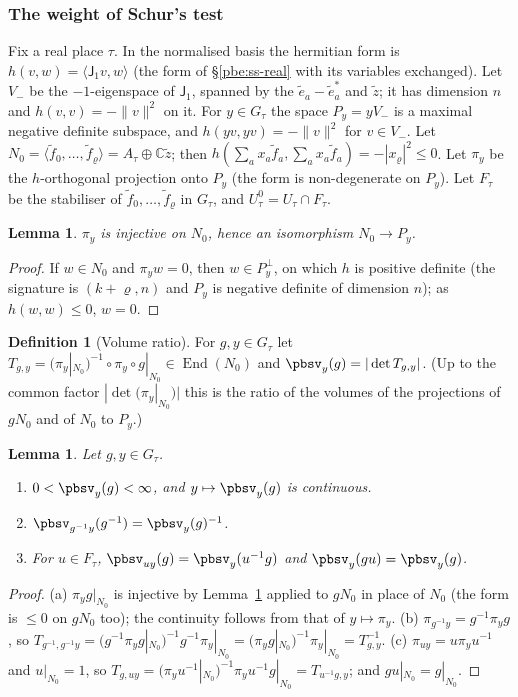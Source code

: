 \documentclass[10pt]{amsart}
\newtheorem{lemma}[theorem]{Lemma}
\theoremstyle{definition}
\newtheorem{definition}[theorem]{Definition}
\theoremstyle{remark}
\newcommand{\C}{\mathbb C}
\begin{document}
\subsubsection{The weight of Schur's test}\label{pbs:ss-schur}

Fix a real place $\tau$. In the normalised basis the hermitian form is $h(v,w)=\langle\mathsf J_1v,
w\rangle$ (the form of \S\ref{pbe:ss-real} with its variables exchanged). Let $V_-$ be the $-1$-eigenspace of $\mathsf J_1$, spanned by the
$\tilde e_a-\tilde e_a^*$ and $\tilde z$; it has dimension $n$ and $h(v,v)=-\|v\|^2$ on it. For $y\in
G_\tau$ the space $P_y=yV_-$ is a maximal negative definite subspace, and $h(yv,yv)=-\|v\|^2$ for
$v\in V_-$. Let $N_0=\langle\tilde f_0,\dots,\tilde f_\varrho\rangle=A_\tau\oplus\C\tilde z$; then
$h(\sum_ax_a\tilde f_a,\sum_ax_a\tilde f_a)=-|x_\varrho|^2\le0$. Let $\pi_y$ be the $h$-orthogonal
projection onto $P_y$ (the form is non-degenerate on $P_y$). Let $F_\tau$ be the stabiliser of
$\tilde f_0,\dots,\tilde f_\varrho$ in $G_\tau$, and $U^0_\tau=U_\tau\cap F_\tau$.

\begin{lemma}\label{pbs:proj}
$\pi_y$ is injective on $N_0$, hence an isomorphism $N_0\to P_y$.
\end{lemma}
\begin{proof}
If $w\in N_0$ and $\pi_yw=0$, then $w\in P_y^\perp$, on which $h$ is positive definite (the signature
is $(k+\varrho,n)$ and $P_y$ is negative definite of dimension $n$); as $h(w,w)\le0$, $w=0$.
\end{proof}

\begin{definition}[Volume ratio]\label{pbs:def-v}
For $g,y\in G_\tau$ let $T_{g,y}=(\pi_y|_{N_0})^{-1}\circ\pi_y\circ g|_{N_0}\in\operatorname{End}(N_0)$ and
$\pbsv_y(g)=|\det T_{g,y}|$. (Up to the common factor $|\det(\pi_y|_{N_0})|$ this is the ratio of the
volumes of the projections of $gN_0$ and of $N_0$ to $P_y$.)
\end{definition}

\begin{lemma}\label{pbs:v-props}
Let $g,y\in G_\tau$.
\begin{enumerate}
\item[(a)] $0<\pbsv_y(g)<\infty$, and $y\mapsto\pbsv_y(g)$ is continuous.
\item[(b)] $\pbsv_{g^{-1}y}(g^{-1})=\pbsv_y(g)^{-1}$.
\item[(c)] For $u\in F_\tau$, $\pbsv_{uy}(g)=\pbsv_y(u^{-1}g)$ and $\pbsv_y(gu)=\pbsv_y(g)$.
\end{enumerate}
\end{lemma}
\begin{proof}
(a) $\pi_y g|_{N_0}$ is injective by Lemma~\ref{pbs:proj} applied to $gN_0$ in place of $N_0$ (the
form is $\le0$ on $gN_0$ too); the continuity follows from that of $y\mapsto\pi_y$. (b) $\pi_{g^{-1}y}
=g^{-1}\pi_yg$, so $T_{g^{-1},g^{-1}y}=(g^{-1}\pi_yg|_{N_0})^{-1}g^{-1}\pi_y|_{N_0}=(\pi_yg|_{N_0})^{-1}
\pi_y|_{N_0}=T_{g,y}^{-1}$. (c) $\pi_{uy}=u\pi_yu^{-1}$ and $u|_{N_0}=1$, so $T_{g,uy}=(\pi_yu^{-1}|_{N_0}
)^{-1}\pi_yu^{-1}g|_{N_0}=T_{u^{-1}g,y}$; and $gu|_{N_0}=g|_{N_0}$.
\end{proof}
\end{document}
